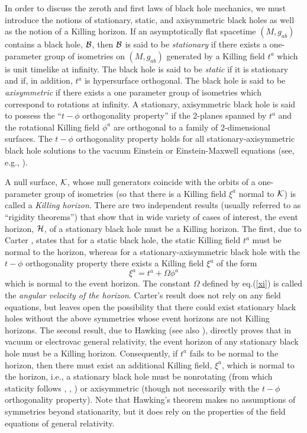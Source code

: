 In order to discuss the zeroth and first laws of black hole mechanics,
we must introduce the notions of stationary, static, and axisymmetric
black holes as well as the notion of a Killing horizon. If an
asymptotically flat spacetime $(M, g_{ab})$ contains a black hole,
${\cal B}$, then ${\cal B}$ is said to be {\em stationary} if there
exists a one-parameter group of isometries on $(M, g_{ab})$ generated
by a Killing field $t^a$ which is unit timelike at infinity. The black
hole is said to be {\em static} if it is stationary and if, in
addition, $t^a$ is hypersurface orthogonal. The black hole is said to
be {\em axisymmetric} if there exists a one parameter group of
isometries which correspond to rotations at infinity. A stationary,
axisymmetric black hole is said to possess the ``$t - \phi$
orthogonality property'' if the 2-planes spanned by $t^a$ and the
rotational Killing field $\phi^a$ are orthogonal to a family of
2-dimensional surfaces. The $t - \phi$ orthogonality property holds
for all stationary-axisymmetric black hole solutions to the vacuum
Einstein or Einstein-Maxwell equations (see, e.g., \cite{heu}).

A null surface, ${\cal K}$, whose null generators coincide with the
orbits of a one-parameter group of isometries (so that there is a
Killing field $\xi^a$ normal to ${\cal K}$) is called a {\em Killing
horizon}. There are two independent results (usually referred to as
``rigidity theorems'') that show that in wide variety of cases of
interest, the event horizon, ${\cal H}$, of a stationary black hole
must be a Killing horizon. The first, due to Carter \cite{c}, states
that for a static black hole, the static Killing field $t^a$ must be
normal to the horizon, whereas for a stationary-axisymmetric black
hole with the $t - \phi$ orthogonality property there exists a Killing
field $\xi^a$ of the form
\begin{equation}
\xi^a = t^a + \Omega \phi^a
\label{xi}
\end{equation}
which is normal to the event horizon. The constant $\Omega$ defined by
eq.(\ref{xi}) is called the {\em angular velocity of the horizon}.
Carter's result does not rely on any field equations, but leaves open
the possibility that there could exist stationary black holes without
the above symmetries whose event horizons are not Killing
horizons. The second result, due to Hawking \cite{he} (see also
\cite{frw}), directly proves that in vacuum or electrovac general
relativity, the event horizon of any stationary black hole must be a
Killing horizon. Consequently, if $t^a$ fails to be normal
to the horizon, then there must exist an additional Killing field,
$\xi^a$, which is normal to the horizon, i.e., a stationary black hole
must be nonrotating (from which staticity follows \cite{sw1}, \cite{sw2},
\cite{cw}) or axisymmetric (though not necessarily with the $t - \phi$
orthogonality property). Note that Hawking's theorem makes no
assumptions of symmetries beyond stationarity, but it does rely on the
properties of the field equations of general relativity.

